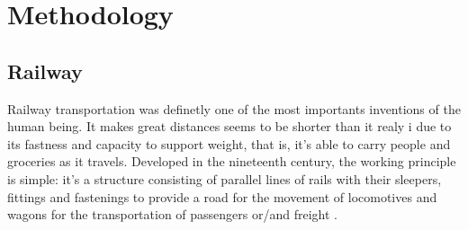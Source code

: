 \chapter{Methodology}\label{cha:methodology}
\section{Railway}\label{sec:railway}

Railway transportation was definetly one of the most importants inventions of the human being. It makes great distances seems to be shorter than it realy i due to its fastness and capacity to support weight, that is, it's able to carry people and groceries as it travels. Developed in the nineteenth century, the working principle is simple: it's a structure consisting of parallel lines of rails with their sleepers, fittings and fastenings to provide a road for the movement of locomotives and wagons for the transportation of passengers or/and freight \citep{mundrey_railway_2009}.